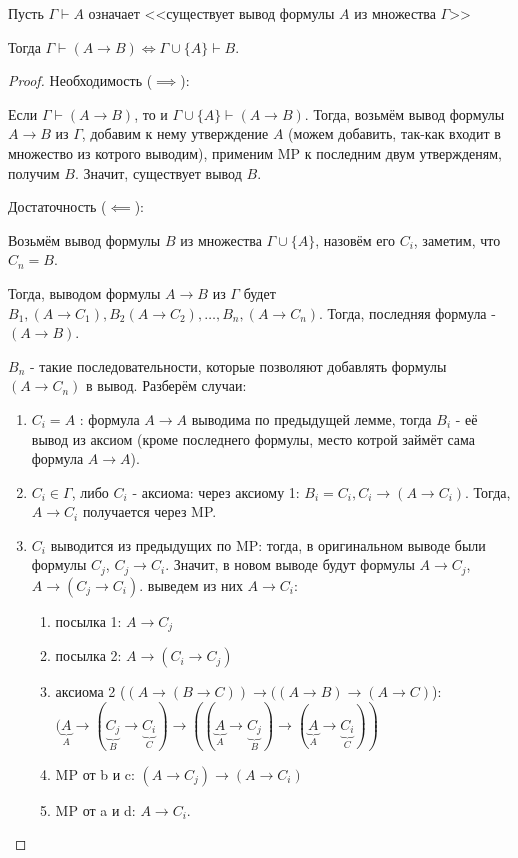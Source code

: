 \begin{lemma}[О дедукции (DT)] \label{logic_DT} \thmslashn

    Пусть $\Gamma \vdash A$ означает <<существует вывод формулы $A$ из множества $\Gamma$>>

    Тогда $\Gamma \vdash (A \to B) \iff \Gamma \cup \{A\} \vdash B $.
    \begin{proof} \thmslashn
    
        Необходимость ($\implies$):

        Если $\Gamma \vdash (A \to B)$, то и $\Gamma \cup \{A\} \vdash (A \to B) $. Тогда, возьмём вывод формулы $A \to B$ из $\Gamma$, добавим к нему утверждение $A$ (можем добавить, так-как входит в множество из котрого выводим), применим MP к последним двум утвержденям, получим $B$. Значит, существует вывод $B$.

        Достаточность ($\impliedby$):

        Возьмём вывод формулы $B$ из множества $\Gamma \cup \{A\}$, назовём его $C_{i}$, заметим, что $C_{n} = B$.

        Тогда, выводом формулы $A \to B$ из $\Gamma$ будет $B_1, (A \to C_1), B_2 (A \to  C_2), \ldots, B_{n}, (A \to C_{n})$. Тогда, последняя формула - $(A \to B)$.

        $B_{n}$ - такие последовательности, которые позволяют добавлять формулы $(A \to C_{n})$ в вывод. Разберём случаи:

        \begin{enumerate}
            \item $C_{i} = A$ : формула $A \to A$ выводима по предыдущей лемме, тогда $B_{i}$ - её вывод из аксиом (кроме последнего формулы, место котрой займёт сама формула $A \to A$).
            \item $C_{i}\in \Gamma$, либо $C_{i}$ - аксиома: через аксиому 1: $B_{i} = C_{i}, C_{i} \to (A \to C_{i})$. Тогда, $A \to C_{i}$ получается через MP.
            \item $C_{i}$ выводится из предыдущих по MP: тогда, в оригинальном выводе были формулы $C_{j}$, $C_{j} \to C_{i}$. Значит, в новом выводе будут формулы $A \to C_{j}$, $A \to (C_{j} \to C_{i})$. выведем из них $A \to C_{i}$:
                \begin{enumerate}
                    \item посылка 1: $A \to C_{j}$
                    \item посылка 2: $A \to (C_{i} \to C_{j})$
                    \item аксиома 2 ($(A \to (B \to C)) \to ((A \to B) \to (A \to C)$):\\
                        $(\underbrace{A}_{A} \to (\underbrace{C_{j}}_{B} \to \underbrace{C_{i}}_{C}) \to ((\underbrace{A}_{A} \to \underbrace{C_{j}}_{B}) \to (\underbrace{A}_{A} \to \underbrace{C_{i}}_{C}))$
                    \item MP от b и c: $(A \to C_{j}) \to (A \to C_{i})$
                    \item MP от a и d: $A \to C_{i}$.
                \end{enumerate}


\end{enumerate}
\end{proof}
\end{lemma}
